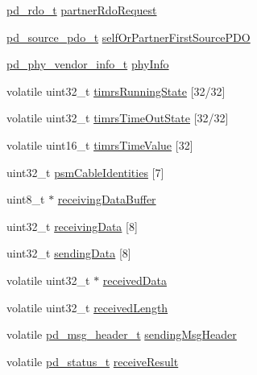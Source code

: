 \begin{DoxyCompactItemize}
\hyperlink{group__usb__pd__stack_ga4dcb1103574222cf94d4b45128f2b884}{pd\-\_\-rdo\-\_\-t} \hyperlink{struct__pd__instance_ad8cdcafc4b643a8f147febada1cd5704}{partner\-Rdo\-Request}
\item 
\hyperlink{group__usb__pd__stack_gae3adfd5239231ab405b04bef0ae1df5a}{pd\-\_\-source\-\_\-pdo\-\_\-t} \hyperlink{struct__pd__instance_ad5c623ba7be298aa8ecdad50a298d609}{self\-Or\-Partner\-First\-Source\-P\-D\-O}
\item 
\hyperlink{group__usb__pd__phy__drv_ga4930ef145bdc6eb8fb43bb431eb305da}{pd\-\_\-phy\-\_\-vendor\-\_\-info\-\_\-t} \hyperlink{struct__pd__instance_a8cf1d14cc029410e591cbfe30d5b2cd9}{phy\-Info}
\item 
volatile uint32\-\_\-t \hyperlink{struct__pd__instance_a00d9a2aa7fd533c3ac15236b61e894f0}{timrs\-Running\-State} \mbox{[}32/32\mbox{]}
\item 
volatile uint32\-\_\-t \hyperlink{struct__pd__instance_a4e19ba81575c13f30d4482d5ac141573}{timrs\-Time\-Out\-State} \mbox{[}32/32\mbox{]}
\item 
volatile uint16\-\_\-t \hyperlink{struct__pd__instance_a10267d00b21df313fb3064255d161d6b}{timrs\-Time\-Value} \mbox{[}32\mbox{]}
\item 
uint32\-\_\-t \hyperlink{struct__pd__instance_ad959040fa9c36726ad10ccc9e46876e9}{psm\-Cable\-Identities} \mbox{[}7\mbox{]}
\item 
uint8\-\_\-t $\ast$ \hyperlink{struct__pd__instance_aa2afb566f855b4b00bcdf335d8d997a3}{receiving\-Data\-Buffer}
\item 
uint32\-\_\-t \hyperlink{struct__pd__instance_a1112b16cc2add6100cbf81134f74caf1}{receiving\-Data} \mbox{[}8\mbox{]}
\item 
uint32\-\_\-t \hyperlink{struct__pd__instance_a6c867a07c66667ea3eab5ec882090e09}{sending\-Data} \mbox{[}8\mbox{]}
\item 
volatile uint32\-\_\-t $\ast$ \hyperlink{struct__pd__instance_accf867a3b224d5e7708c3167b49eb259}{received\-Data}
\item 
volatile uint32\-\_\-t \hyperlink{struct__pd__instance_a0d570b6b188a0e6756df839f35f346b5}{received\-Length}
\item 
volatile \hyperlink{group__usb__pd__stack_ga38ef16bfe01e9e07d6b3ac77648c6bee}{pd\-\_\-msg\-\_\-header\-\_\-t} \hyperlink{struct__pd__instance_a6031ed1c3ec10c04ea5daf9a76485f68}{sending\-Msg\-Header}
\item 
volatile \hyperlink{group__usb__pd__stack_ga04a1f331d9807a70ab9bb753f5ed1c80}{pd\-\_\-status\-\_\-t} \hyperlink{struct__pd__instance_a64014dae5dccd1adb710c12fcc8b23cf}{receive\-Result}

\end{DoxyCompactItemize}
